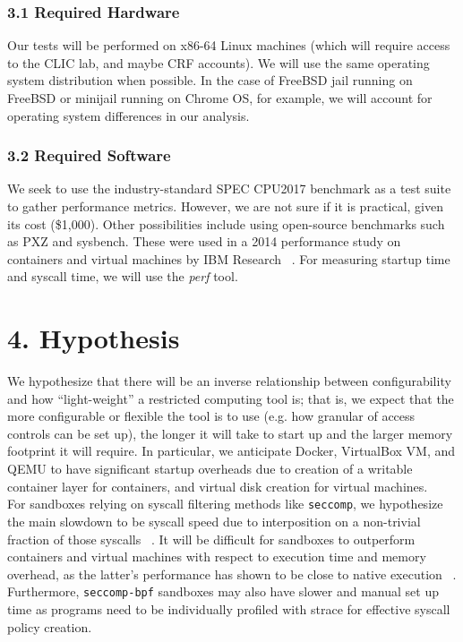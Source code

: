 \documentclass{proc}
\begin{document}
\subsubsection*{3.1 Required Hardware}
Our tests will be performed on x86-64 Linux machines (which will require access to the CLIC lab, and maybe CRF accounts). We will use the same operating system distribution when possible. In the case of FreeBSD jail running on FreeBSD or minijail running on Chrome OS, for example, we will account for operating system differences in our analysis.
\subsubsection*{3.2 Required Software}
We seek to use the industry-standard SPEC CPU2017 benchmark \cite{limaye2018spec} as a test suite to gather performance metrics. However, we are not sure if it is practical, given its cost (\$1,000). Other possibilities include using open-source benchmarks such as PXZ and sysbench. These were used in a 2014 performance study on containers and virtual machines by IBM Research ~\cite{felter2014docker}. For measuring startup time and syscall time, we will use the \emph{perf} tool.
\section*{4. Hypothesis}
We hypothesize that there will be an inverse relationship between configurability and how ``light-weight'' a restricted computing tool is; that is, we expect that the more configurable or flexible the tool is to use (e.g. how granular of access controls can be set up), the longer it will take to start up and the larger memory footprint it will require. In particular, we anticipate Docker, VirtualBox VM, and QEMU to have significant startup overheads due to creation of a writable container layer for containers, and virtual disk creation for virtual machines.\\

For sandboxes relying on syscall filtering methods like \texttt{seccomp}, we hypothesize the main slowdown to be syscall speed due to interposition on a non-trivial fraction of those syscalls ~\cite{kim2013mbox}. It will be difficult for sandboxes to outperform containers and virtual machines with respect to execution time and memory overhead, as the latter's performance has shown to be close to native execution ~\cite{felter2014docker}. Furthermore, \texttt{seccomp-bpf} sandboxes may also have slower and manual set up time as programs need to be individually profiled with strace for effective syscall policy creation.
\end{document}
